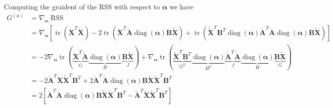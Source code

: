 \documentclass[oneside]{article}
\begin{document}
Computing the graident of the RSS with respect to $\boldsymbol{\alpha}$ we have
\begin{equation}
    \label{eq:relaxed_weighted_objective_grad_alpha}
    \begin{aligned}
        G^{(\alpha)}
        &= \nabla_{\boldsymbol{\alpha}} \operatorname{RSS} \\
        &= \nabla_{\boldsymbol{\alpha}}
        \left[
            \operatorname{tr}\left( \breve{\mathbf{X}}^T \breve{\mathbf{X}} \right)
            - 2 \operatorname{tr} \left( \breve{\mathbf{X}}^T \breve{\mathbf{A}} \operatorname{diag}(\boldsymbol{\alpha}) \mathbf{B} \tilde{\mathbf{X}} \right)
            + \operatorname{tr} \left( \tilde{\mathbf{X}}^T \mathbf{B}^T \operatorname{diag}(\boldsymbol{\alpha}) \breve{\mathbf{A}}^T \breve{\mathbf{A}} \operatorname{diag}(\boldsymbol{\alpha}) \mathbf{B} \tilde{\mathbf{X}} \right)
        \right] \\
        &=
            - 2 \nabla_{\boldsymbol{\alpha}} \operatorname{tr}(\underbrace{\breve{\mathbf{X}}^T \breve{\mathbf{A}}}_{G} \underbrace{\operatorname{diag}(\boldsymbol{\alpha})}_{H} \underbrace{\mathbf{B} \tilde{\mathbf{X}}}_{J})
            + \nabla_{\boldsymbol{\alpha}} \operatorname{tr}(\underbrace{\tilde{\mathbf{X}}^T \mathbf{B}^T }_{G^T} \underbrace{\operatorname{diag}(\boldsymbol{\alpha})}_{H^T} \underbrace{\breve{\mathbf{A}}^T \breve{\mathbf{A}}}_{J} \underbrace{\operatorname{diag}(\boldsymbol{\alpha})}_{H} \underbrace{\mathbf{B} \tilde{\mathbf{X}}}_{G}) \\
        & =
            -2 \breve{\mathbf{A}}^T \breve{\mathbf{X}} \tilde{\mathbf{X}}^T \mathbf{B}^T
            +2 \breve{\mathbf{A}}^T \breve{\mathbf{A}} \operatorname{diag}(\boldsymbol{\alpha}) \mathbf{B} \tilde{\mathbf{X}} \tilde{\mathbf{X}}^T \mathbf{B}^T  \\
        & = 2
        \left[
            \breve{\mathbf{A}}^T \breve{\mathbf{A}} \operatorname{diag}(\boldsymbol{\alpha}) \mathbf{B} \tilde{\mathbf{X}} \tilde{\mathbf{X}}^T \mathbf{B}^T
            - \breve{\mathbf{A}}^T \breve{\mathbf{X}} \tilde{\mathbf{X}}^T \mathbf{B}^T
        \right]
    \end{aligned}
\end{equation}
\end{document}
